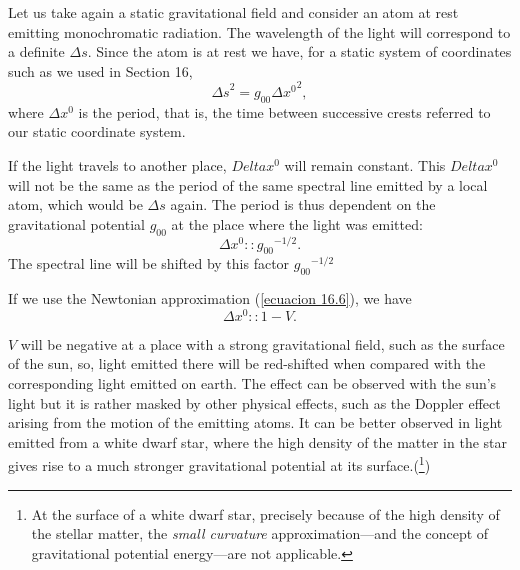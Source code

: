 Let us take again a static gravitational field and consider an atom at rest emitting monochromatic radiation. The 
wavelength of the light will correspond to a definite $\Delta s$. Since the atom is at rest we have, for a static 
system of coordinates such as we used in Section 16,
\[
    {\Delta s}^2 = g_{00}{\Delta x^0}^2,
\]
where $\Delta x^0$ is the period, that is, the time between successive crests referred to our static coordinate system.

If the light travels to another place, $Delta x^0$ will remain constant. This $Delta x^0$ will not be the same as the 
period of the same spectral line emitted by a local atom, which would be $\Delta s$ again. The period is thus dependent 
on the gravitational potential $g_{00}$ at the place where the light was emitted:
\[
    \Delta x^0 :: {g_{00}}^{-1/2}.
\]
The spectral line will be shifted by this factor ${g_{00}}^{-1/2}$

If we use the Newtonian approximation (\ref{ecuacion 16.6}), we have 
\[
    \Delta x^0 :: 1 - V.
\]

$V$ will be negative at a place with a strong gravitational field, such as the surface of the sun, so, light emitted 
there will be red-shifted when compared with the corresponding light emitted on earth. The effect can be observed with 
the sun's light but it is rather masked by other physical effects, such as the Doppler effect arising from the motion 
of the emitting atoms. It can be better observed in light emitted from a white dwarf star, where the high density of 
the matter in the star gives rise to a much stronger gravitational potential at its surface.(\footnote{At the surface 
of a white dwarf star, precisely because of the high density of the stellar matter, the \emph{small curvature} 
approximation---and the concept of gravitational potential energy---are not applicable.}) 
